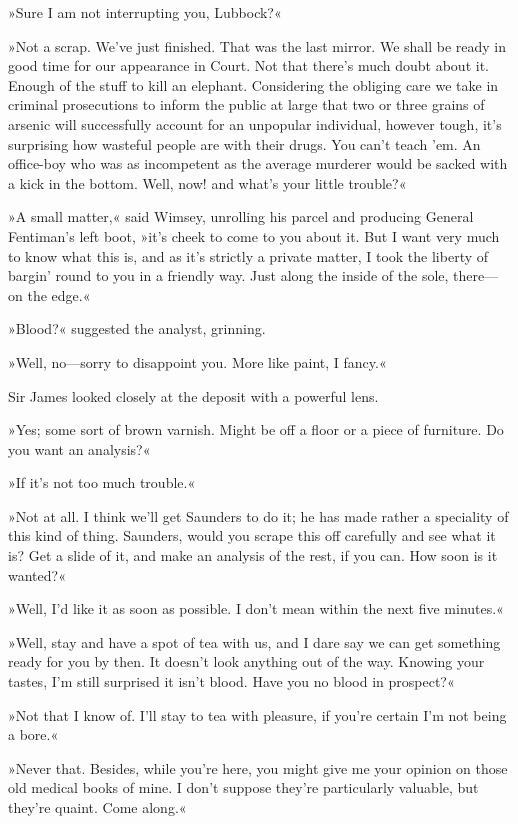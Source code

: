 »Sure I am not interrupting you, Lubbock?«

»Not a scrap. We've just finished. That was the last mirror. We shall be ready in good time for our appearance in Court. Not that there's much doubt about it. Enough of the stuff to kill an elephant. Considering the obliging care we take in criminal prosecutions to inform the public at large that two or three grains of arsenic will successfully account for an unpopular individual, however tough, it's surprising how wasteful people are with their drugs. You can't teach 'em. An office-boy who was as incompetent as the average murderer would be sacked with a kick in the bottom. Well, now! and what's your little trouble?«

»A small matter,« said Wimsey, unrolling his parcel and producing General Fentiman's left boot, »it's cheek to come to you about it. But I want very much to know what this is, and as it's strictly a private matter, I took the liberty of bargin' round to you in a friendly way. Just along the inside of the sole, there—on the edge.«

»Blood?« suggested the analyst, grinning.

»Well, no—sorry to disappoint you. More like paint, I fancy.«

Sir James looked closely at the deposit with a powerful lens.

»Yes; some sort of brown varnish. Might be off a floor or a piece of furniture. Do you want an analysis?«

»If it's not too much trouble.«

»Not at all. I think we'll get Saunders to do it; he has made rather a speciality of this kind of thing. Saunders, would you scrape this off carefully and see what it is? Get a slide of it, and make an analysis of the rest, if you can. How soon is it wanted?«

»Well, I'd like it as soon as possible. I don't mean within the next five minutes.«

»Well, stay and have a spot of tea with us, and I dare say we can get something ready for you by then. It doesn't look anything out of the way. Knowing your tastes, I'm still surprised it isn't blood. Have you no blood in prospect?«

»Not that I know of. I'll stay to tea with pleasure, if you're certain I'm not being a bore.«

»Never that. Besides, while you're here, you might give me your opinion on those old medical books of mine. I don't suppose they're particularly valuable, but they're quaint. Come along.«

